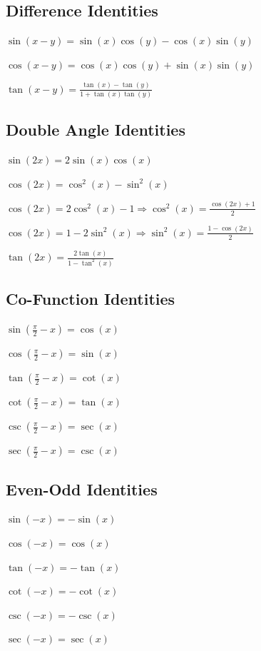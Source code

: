 \documentclass[8pt,a4paper]{extarticle}     %
\theoremstyle{definition}
\theoremstyle{definition}
\theoremstyle{definition}
\begin{document}
\begin{multicols}{4}
\subsection{Difference Identities}	
\begin{eqlist}
	\item $\sin(x - y) = \sin(x)\cos(y) - \cos(x)\sin(y)$
	\item $\cos(x - y) = \cos(x)\cos(y) + \sin(x)\sin(y)$
	\item $\tan(x - y) = \frac{\tan(x) - \tan(y)}{1 + \tan(x)\tan(y)}$
\end{eqlist}

\subsection{Double Angle Identities}	
\begin{eqlist}
	\item $\sin(2x) = 2\sin(x)\cos(x)$
	\item $\cos(2x) = \cos^2(x) - \sin^2(x) $
	\item $\cos(2x) = 2\cos^2(x) - 1 \Rightarrow \cos^2(x) = \frac{\cos(2x)+1}{2}$
	\item $\cos(2x) = 1 - 2\sin^2(x) \Rightarrow \sin^2(x) = \frac{1-\cos(2x)}{2}$
	\item $\tan(2x) = \frac{2\tan(x)}{1-\tan^2(x)} $
\end{eqlist}

\subsection{Co-Function Identities}	
\begin{eqlist}
	\item $\sin\left(\frac{\pi}{2}-x\right) = \cos(x)$
	\item $\cos\left(\frac{\pi}{2}-x\right) = \sin(x)$
	\item $\tan\left(\frac{\pi}{2}-x\right) = \cot(x)$
	\item $\cot\left(\frac{\pi}{2}-x\right) = \tan(x)$
	\item $\csc\left(\frac{\pi}{2}-x\right) = \sec(x)$	
	\item $\sec\left(\frac{\pi}{2}-x\right) = \csc(x)$
\end{eqlist}

\subsection{Even-Odd Identities}	
\begin{eqlist}
	\item $\sin(-x) = -\sin(x)$
	\item $\cos(-x) = \cos(x)$
	\item $\tan(-x) = -\tan(x)$
	\item $\cot(-x) = -\cot(x)$
	\item $\csc(-x) = -\csc(x)$
	\item $\sec(-x) = \sec(x)$
\end{eqlist}


\end{multicols}
\end{document}
